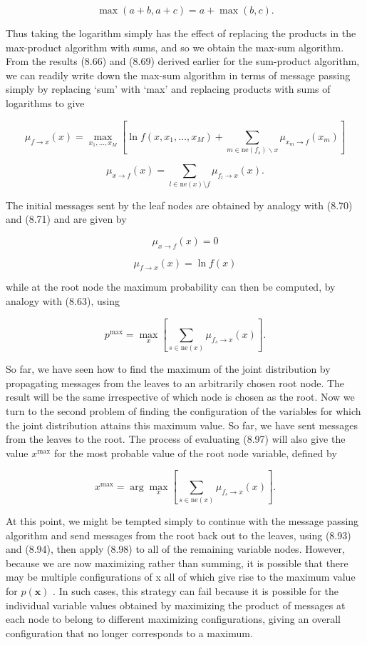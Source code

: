 \documentclass[
  10
]{article}
\begin{document}
\[
\max (a + b, a + c) = a + \max (b, c).\tag{8.92}
\]

Thus taking the logarithm simply has the effect of replacing the
products in the max-product algorithm with sums, and so we obtain the
max-sum algorithm. From the results (8.66) and (8.69) derived earlier
for the sum-product algorithm, we can readily write down the max-sum
algorithm in terms of message passing simply by replacing `sum' with
`max' and replacing products with sums of logarithms to give

\[
\mu_ {f \rightarrow x} (x) = \max _ {x _ {1}, \dots , x _ {M}} \left[ \ln f (x, x _ {1}, \dots , x _ {M}) + \sum_ {m \in \mathrm{ne} (f _ {s}) \backslash x} \mu_ {x _ {m} \rightarrow f} (x _ {m}) \right]\tag{8.93}
\]

\[
\mu_ {x \to f} (x) = \sum_ {l \in \mathrm{ne} (x) \setminus f} \mu_ {f _ {l} \to x} (x).\tag{8.94}
\]

The initial messages sent by the leaf nodes are obtained by analogy with
(8.70) and (8.71) and are given by

\[
\mu_ {x \to f} (x) = 0\tag{8.95}
\]

\[
\mu_ {f \to x} (x) = \ln f (x)\tag{8.96}
\]

while at the root node the maximum probability can then be computed, by
analogy with (8.63), using

\[
p ^ {\max} = \max _ {x} \left[ \sum_ {s \in \mathrm{ne} (x)} \mu_ {f _ {s} \to x} (x) \right].\tag{8.97}
\]

So far, we have seen how to find the maximum of the joint distribution
by propagating messages from the leaves to an arbitrarily chosen root
node. The result will be the same irrespective of which node is chosen
as the root. Now we turn to the second problem of finding the
configuration of the variables for which the joint distribution attains
this maximum value. So far, we have sent messages from the leaves to the
root. The process of evaluating (8.97) will also give the value
\(x ^ { \mathrm { m a x } }\) for the most probable value of the root
node variable, defined by

\[
x ^ {\max} = \arg \max _ {x} \left[ \sum_ {s \in \mathrm{ne} (x)} \mu_ {f _ {s} \to x} (x) \right].\tag{8.98}
\]

At this point, we might be tempted simply to continue with the message
passing algorithm and send messages from the root back out to the
leaves, using (8.93) and (8.94), then apply (8.98) to all of the
remaining variable nodes. However, because we are now maximizing rather
than summing, it is possible that there may be multiple configurations
of x all of which give rise to the maximum value for
\(p ( \mathbf { x } )\) . In such cases, this strategy can fail because
it is possible for the individual variable values obtained by maximizing
the product of messages at each node to belong to different maximizing
configurations, giving an overall configuration that no longer
corresponds to a maximum.
\end{document}
